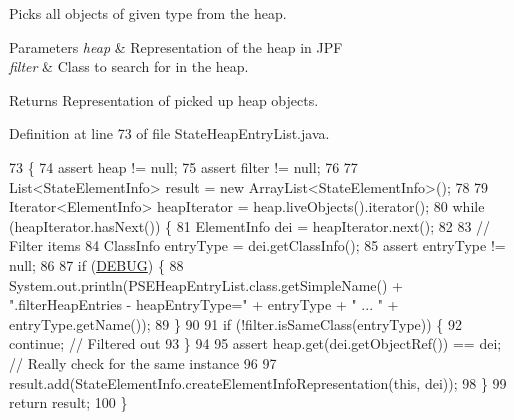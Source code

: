 Picks all objects of given type from the heap. 


\begin{DoxyParams}{Parameters}
{\em heap} & Representation of the heap in J\+PF \\
\hline
{\em filter} & Class to search for in the heap. \\
\hline
\end{DoxyParams}
\begin{DoxyReturn}{Returns}
Representation of picked up heap objects. 
\end{DoxyReturn}


Definition at line 73 of file State\+Heap\+Entry\+List.\+java.


\begin{DoxyCode}
73                                                                                  \{
74     assert heap != null;
75     assert filter != null;
76 
77     List<StateElementInfo> result = \textcolor{keyword}{new} ArrayList<StateElementInfo>();
78 
79     Iterator<ElementInfo> heapIterator = heap.liveObjects().iterator();
80     \textcolor{keywordflow}{while} (heapIterator.hasNext()) \{
81       ElementInfo dei = heapIterator.next();
82 
83       \textcolor{comment}{// Filter items}
84       ClassInfo entryType = dei.getClassInfo();
85       assert entryType != null;
86 
87       \textcolor{keywordflow}{if} (\hyperlink{classgov_1_1nasa_1_1jpf_1_1inspector_1_1server_1_1programstate_1_1_state_heap_entry_list_a3880b67f48282ea20d19ffa19491ec35}{DEBUG}) \{
88         System.out.println(PSEHeapEntryList.class.getSimpleName() + \textcolor{stringliteral}{".filterHeapEntries - heapEntryType="} +
       entryType + \textcolor{stringliteral}{" ... "} + entryType.getName());
89       \}
90 
91       \textcolor{keywordflow}{if} (!filter.isSameClass(entryType)) \{
92         \textcolor{keywordflow}{continue}; \textcolor{comment}{// Filtered out}
93       \}
94 
95       assert heap.get(dei.getObjectRef()) == dei; \textcolor{comment}{// Really check for the same instance}
96 
97       result.add(StateElementInfo.createElementInfoRepresentation(\textcolor{keyword}{this}, dei));
98     \}
99     \textcolor{keywordflow}{return} result;
100   \}
\end{DoxyCode}
